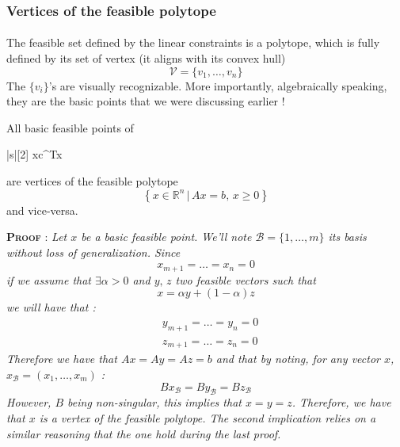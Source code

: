 \documentclass[a4paper]{article}
\begin{document}
{{			\subsubsection{Vertices of the feasible polytope}
			{
				\paragraph{} The feasible set defined by the linear constraints is a polytope, which is fully defined by its set of vertex (it aligns with its convex hull)
				$$
					\mathcal{V}=\{v_1,\hdots,v_n\}
				$$
				The $\{v_i\}$'s are visually recognizable. More importantly, algebraically speaking, they are the basic points that we were discussing earlier !
				\vspace{10pt}
				
				{
					All basic feasible points of 
					\begin{mini}|s|[2]
					{x}{c^Tx}
					{}{}
					\end{mini}
					are vertices of the feasible polytope 
					\begin{equation}
						\left\{x\in\mathbb{R}^n \, \vert \, Ax=b, \, x\geq 0 \right\}
					\end{equation}
					and vice-versa. 
				}
				
					\begin{leftbar}
					\noindent\textbf{\textsc{Proof}} : \emph{Let $x$ be a basic feasible point. We'll note $\mathcal{B} = \{1,\hdots, m\}$ its basis without loss of generalization. Since 
					$$
						x_{m+1} = \hdots = x_n = 0
					$$
					if we assume that $\exists \alpha >0$ and $y, \, z$ two feasible vectors such that 
					$$
						x = \alpha y + (1-\alpha) z 
					$$
					we will have that : 
					$$
						\begin{aligned}
							&y_{m+1} = \hdots = y_n = 0 \\
							&z_{m+1} = \hdots = z_n = 0
						\end{aligned}
					$$
					Therefore we have that $Ax = Ay = Az = b$ and that by noting, for any vector $x$, $x_\mathcal{B} = (x_1,\hdots,x_m)$ : 
					$$
						Bx_\mathcal{B} = By_\mathcal{B} = Bz_\mathcal{B} 
					$$
					However, $B$ being non-singular, this implies that $x=y=z$. Therefore, we have that $x$ is a vertex of the feasible polytope. The second implication relies on a similar reasoning that the one hold during the last proof. 
					}
				\end{leftbar}
				
			}
		}
	}
	
\end{document}
